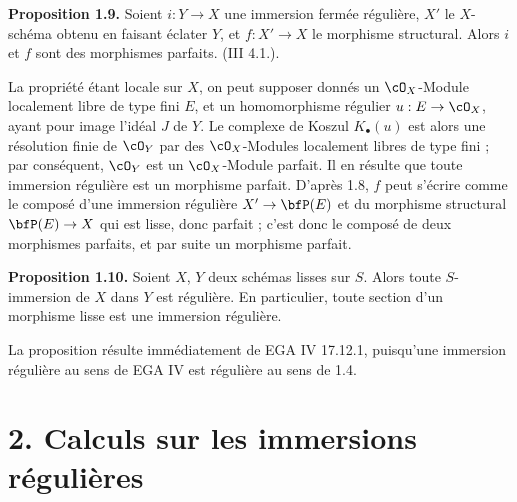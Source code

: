 \textbf{Proposition 1.9.} Soient \(i:Y\to X\) une immersion fermée régulière, \(X'\) le \(X\)-schéma obtenu en faisant éclater \(Y\), et \(f:X'\to X\) le morphisme structural. Alors \(i\) et \(f\) sont des morphismes parfaits. (III 4.1.).

La propriété étant locale sur \(X\), on peut supposer donnés un \(\cO_X\)-Module localement libre de type fini \(E\), et un homomorphisme régulier \(u:E\to\cO_X\), ayant pour image l'idéal \(J\) de \(Y\). Le complexe de Koszul \(K_\bullet(u)\) est alors une résolution finie de \(\cO_Y\) par des \(\cO_X\)-Modules localement libres de type fini ; par conséquent, \(\cO_Y\) est un \(\cO_X\)-Module parfait. Il en résulte que toute immersion régulière est un morphisme parfait. D'après 1.8, \(f\) peut s'écrire comme le composé d'une immersion régulière \(X'\to\bfP(E)\) et du morphisme structural \(\bfP(E)\to X\) qui est lisse, donc parfait ; c'est donc le
composé de deux morphismes parfaits, et par suite un morphisme parfait.

\textbf{Proposition 1.10.} Soient \(X\), \(Y\) deux schémas lisses sur \(S\). Alors toute \(S\)-immersion de \(X\) dans \(Y\) est régulière. En particulier, toute section d'un morphisme lisse est une immersion régulière.

La proposition résulte immédiatement de EGA IV 17.12.1, puisqu'une immersion régulière au sens de EGA IV est régulière au sens de 1.4.

\section*{2. Calculs sur les immersions régulières}


